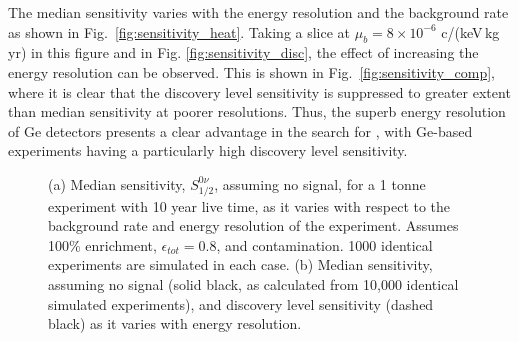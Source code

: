 The median sensitivity varies with the energy resolution and the background rate as shown in Fig.~\ref{fig:sensitivity_heat}. Taking a slice at $\mu_b = 8 \times 10^{-6}$ c/(keV\,kg\,yr) in this figure and in Fig. \ref{fig:sensitivity_disc}, the effect of increasing the energy resolution can be observed. This is shown in Fig.~\ref{fig:sensitivity_comp}, where it is clear that the discovery level sensitivity is suppressed to greater extent than median sensitivity at poorer resolutions. Thus, the superb energy resolution of Ge detectors presents a clear advantage in the search for \novbb{}, with Ge-based experiments having a particularly high discovery level sensitivity.
\begin{figure}[H]
	\centering
	\caption{(a) Median sensitivity, $S^{0\nu}_{1/2}$, assuming no signal, for a 1 tonne \geEn{} experiment with 10 year live time, as it varies with respect to the background rate and energy resolution of the experiment. Assumes 100\% enrichment, $\epsilon_{tot} = 0.8$, and \twovbb{} contamination. 1000 identical experiments are simulated in each case. (b) Median sensitivity, assuming no signal (solid black, as calculated from 10,000 identical simulated experiments), and discovery level sensitivity (dashed black) as it varies with energy resolution.} 
	\label{fig:sensitivity}
\end{figure}

